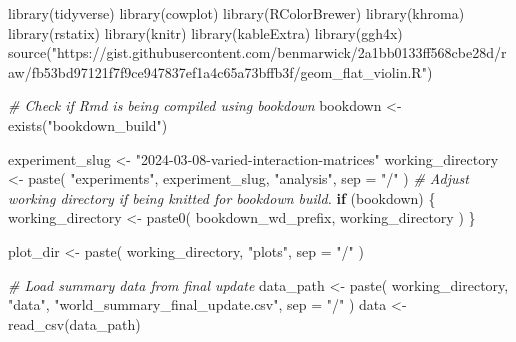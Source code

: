 \documentclass[
]{book}
\newenvironment{Shaded}{\begin{snugshade}}{\end{snugshade}}
\newcommand{\AttributeTok}[1]{\textcolor[rgb]{0.77,0.63,0.00}{#1}}
\newcommand{\CommentTok}[1]{\textcolor[rgb]{0.56,0.35,0.01}{\textit{#1}}}
\newcommand{\ControlFlowTok}[1]{\textcolor[rgb]{0.13,0.29,0.53}{\textbf{#1}}}
\newcommand{\FunctionTok}[1]{\textcolor[rgb]{0.00,0.00,0.00}{#1}}
\newcommand{\NormalTok}[1]{#1}
\newcommand{\OtherTok}[1]{\textcolor[rgb]{0.56,0.35,0.01}{#1}}
\newcommand{\StringTok}[1]{\textcolor[rgb]{0.31,0.60,0.02}{#1}}
\begin{document}
\begin{Shaded}
\begin{Highlighting}[]
\FunctionTok{library}\NormalTok{(tidyverse)}
\FunctionTok{library}\NormalTok{(cowplot)}
\FunctionTok{library}\NormalTok{(RColorBrewer)}
\FunctionTok{library}\NormalTok{(khroma)}
\FunctionTok{library}\NormalTok{(rstatix)}
\FunctionTok{library}\NormalTok{(knitr)}
\FunctionTok{library}\NormalTok{(kableExtra)}
\FunctionTok{library}\NormalTok{(ggh4x)}
\FunctionTok{source}\NormalTok{(}\StringTok{"https://gist.githubusercontent.com/benmarwick/2a1bb0133ff568cbe28d/raw/fb53bd97121f7f9ce947837ef1a4c65a73bffb3f/geom\_flat\_violin.R"}\NormalTok{)}
\end{Highlighting}
\end{Shaded}

\begin{Shaded}
\begin{Highlighting}[]
\CommentTok{\# Check if Rmd is being compiled using bookdown}
\NormalTok{bookdown }\OtherTok{\textless{}{-}} \FunctionTok{exists}\NormalTok{(}\StringTok{"bookdown\_build"}\NormalTok{)}
\end{Highlighting}
\end{Shaded}

\begin{Shaded}
\begin{Highlighting}[]
\NormalTok{experiment\_slug }\OtherTok{\textless{}{-}} \StringTok{"2024{-}03{-}08{-}varied{-}interaction{-}matrices"}
\NormalTok{working\_directory }\OtherTok{\textless{}{-}} \FunctionTok{paste}\NormalTok{(}
  \StringTok{"experiments"}\NormalTok{,}
\NormalTok{  experiment\_slug,}
  \StringTok{"analysis"}\NormalTok{,}
  \AttributeTok{sep =} \StringTok{"/"}
\NormalTok{)}
\CommentTok{\# Adjust working directory if being knitted for bookdown build.}
\ControlFlowTok{if}\NormalTok{ (bookdown) \{}
\NormalTok{  working\_directory }\OtherTok{\textless{}{-}} \FunctionTok{paste0}\NormalTok{(}
\NormalTok{    bookdown\_wd\_prefix,}
\NormalTok{    working\_directory}
\NormalTok{  )}
\NormalTok{\}}

\NormalTok{plot\_dir }\OtherTok{\textless{}{-}} \FunctionTok{paste}\NormalTok{(}
\NormalTok{  working\_directory,}
  \StringTok{"plots"}\NormalTok{,}
  \AttributeTok{sep =} \StringTok{"/"}
\NormalTok{)}

\CommentTok{\# Load summary data from final update}
\NormalTok{data\_path }\OtherTok{\textless{}{-}} \FunctionTok{paste}\NormalTok{(}
\NormalTok{  working\_directory,}
  \StringTok{"data"}\NormalTok{,}
  \StringTok{"world\_summary\_final\_update.csv"}\NormalTok{,}
  \AttributeTok{sep =} \StringTok{"/"}
\NormalTok{)}
\NormalTok{data }\OtherTok{\textless{}{-}} \FunctionTok{read\_csv}\NormalTok{(data\_path)}
\end{Highlighting}
\end{Shaded}
\end{document}
